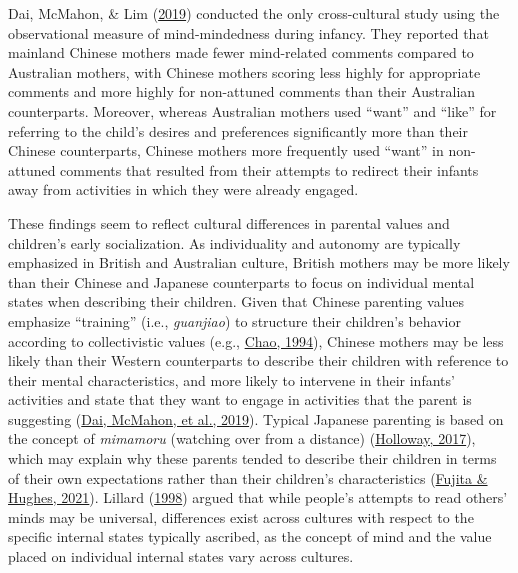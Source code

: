 \documentclass[
]{article}
\begin{document}
Dai, McMahon, \& Lim (\protect\hyperlink{ref-Dai2019b}{2019}) conducted the only cross-cultural study using the observational measure of mind-mindedness during infancy. They reported that mainland Chinese mothers made fewer mind-related comments compared to Australian mothers, with Chinese mothers scoring less highly for appropriate comments and more highly for non-attuned comments than their Australian counterparts. Moreover, whereas Australian mothers used ``want'' and ``like'' for referring to the child's desires and preferences significantly more than their Chinese counterparts, Chinese mothers more frequently used ``want'' in non-attuned comments that resulted from their attempts to redirect their infants away from activities in which they were already engaged.

These findings seem to reflect cultural differences in parental values and children's early socialization. As individuality and autonomy are typically emphasized in British and Australian culture, British mothers may be more likely than their Chinese and Japanese counterparts to focus on individual mental states when describing their children. Given that Chinese parenting values emphasize ``training'' (i.e., \emph{guanjiao}) to structure their children's behavior according to collectivistic values (e.g., \protect\hyperlink{ref-Chao1994}{Chao, 1994}), Chinese mothers may be less likely than their Western counterparts to describe their children with reference to their mental characteristics, and more likely to intervene in their infants' activities and state that they want to engage in activities that the parent is suggesting (\protect\hyperlink{ref-Dai2019b}{Dai, McMahon, et al., 2019}). Typical Japanese parenting is based on the concept of \emph{mimamoru} (watching over from a distance) (\protect\hyperlink{ref-Holloway2017}{Holloway, 2017}), which may explain why these parents tended to describe their children in terms of their own expectations rather than their children's characteristics (\protect\hyperlink{ref-Fujita2021}{Fujita \& Hughes, 2021}). Lillard (\protect\hyperlink{ref-Lillard1998}{1998}) argued that while people's attempts to read others' minds may be universal, differences exist across cultures with respect to the specific internal states typically ascribed, as the concept of mind and the value placed on individual internal states vary across cultures.
\end{document}
